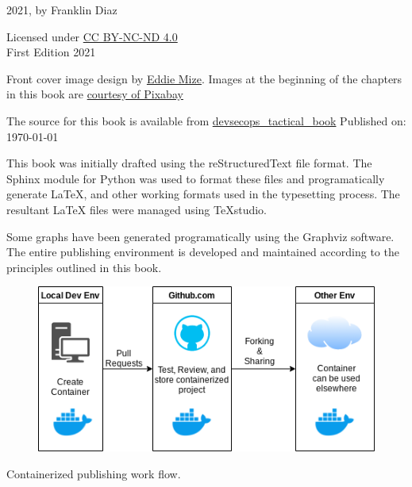 \justify
\textcopyright{} 2021, by Franklin Diaz

\justify
Licensed under \href{https://creativecommons.org/licenses/by-nc-nd/4.0/}{CC BY-NC-ND 4.0}
\vspace{5mm}\\
First Edition 2021

\justify
Front cover image design by {\href{https://www.linkedin.com/in/eddiemize/}{Eddie Mize}}.
Images at the beginning of the chapters in this book are
\href{https://pixabay.com/service/terms/#license}{courtesy of Pixabay}

\justify
The source for this book is available from 
{\href{https://github.com/thedevilsvoice/devsecops\_tactical\_book}{devsecops\_tactical\_book}}
\vspace{3mm}
Published on: \today

\justify
This book was initially drafted using the reStructuredText file format.
The Sphinx module for Python was used to format these files and programatically
generate LaTeX, and other working formats used in the typesetting process. The
resultant LaTeX files were managed using TeXstudio.

Some graphs have been generated programatically using the Graphviz software.
The entire publishing environment is developed and maintained according
to the principles outlined in this book.

\vspace{5mm}
\centering
\vspace{0mm}
\begin{figure}[!htb]
	\centering
	\includegraphics[scale=0.75]{../images/workflow.png}
\end{figure}
\vspace{2mm}
Containerized publishing work flow.

